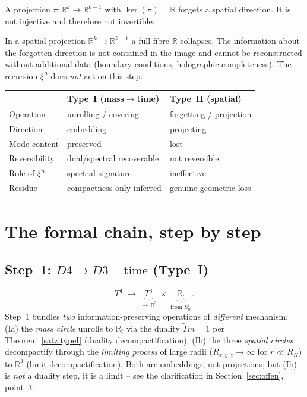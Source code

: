 \begin{definition}\label{def:typeII}
A projection $\pi:\mathbb{R}^{k}\to\mathbb{R}^{k-1}$ with $\ker(\pi)=\mathbb{R}$
forgets a spatial direction. It is not injective and therefore not invertible.
\end{definition}

\begin{theorem}\label{satz:typeII}
In a spatial projection $\mathbb{R}^k \to \mathbb{R}^{k-1}$ a full fibre
$\mathbb{R}$ collapses. The information about the forgotten direction is not
contained in the image and cannot be reconstructed without additional data
(boundary conditions, holographic completeness). The recursion $\xi^n$ does
\emph{not} act on this step.
\end{theorem}

\begin{center}
\begin{tabular}{lll}
\hline
 & \textbf{Type~I (mass$\to$time)} & \textbf{Type~II (spatial)} \\
\hline
Operation & unrolling / covering & forgetting / projection \\
Direction & embedding & projecting \\
Mode content & preserved & lost \\
Reversibility & dual/spectral recoverable & not reversible \\
Role of $\xi^n$ & spectral signature & ineffective \\
Residue & compactness only inferred & genuine geometric loss \\
\hline
\end{tabular}
\end{center}

\section{The formal chain, step by step}

\subsection{Step~1: $D4 \to D3 + \text{time}$ (Type~I)}
\[
  T^4 \;\longrightarrow\; \underbrace{T^3}_{\to\,\mathbb{R}^3}
  \;\times\; \underbrace{\mathbb{R}_t}_{\text{from } S^1_m}.
\]
Step~1 bundles \emph{two} information-preserving operations of \emph{different}
mechanism: (Ia) the \emph{mass circle} unrolls to $\mathbb{R}_t$ via the duality
$\tilde T m=1$ per Theorem~\ref{satz:typeI} (duality decompactification);
(Ib) the three \emph{spatial circles} decompactify through the \emph{limiting
process} of large radii ($R_{x,y,z}\to\infty$ for $r\ll R_H$) to $\mathbb{R}^3$
(limit decompactification). Both are embeddings, not projections; but (Ib) is
\emph{not} a duality step, it is a limit -- see the clarification in
Section~\ref{sec:offen}, point~3.

